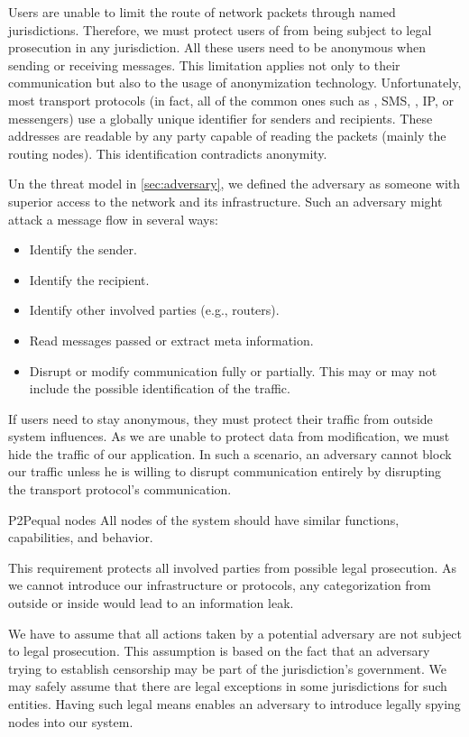 Users are unable to limit the route of network packets through named jurisdictions. Therefore, we must protect users of \MessageVortex{} from being subject to legal prosecution in any jurisdiction. All these users need to be anonymous when sending or receiving messages. This limitation applies not only to their communication but also to the usage of anonymization technology. Unfortunately, most transport protocols (in fact, all of the common ones such as , SMS, , IP, or messengers) use a globally unique identifier for senders and recipients. These addresses are readable by any party capable of reading the packets (mainly the routing nodes).  This identification contradicts anonymity.

Un the threat model in \cref{sec:adversary}, we defined the adversary as someone with superior access to the network and its infrastructure. Such an adversary might attack a message flow in several ways:
\begin{itemize}
	\item Identify the sender.
	\item Identify the recipient.
	\item Identify other involved parties (e.g., routers).
	\item Read messages passed or extract meta information.
	\item Disrupt or modify communication fully or partially. This may or may not include the possible identification of the traffic.
\end{itemize}

If users need to stay anonymous, they must protect their traffic from outside system influences. As we are unable to protect data from modification, we must hide the traffic of our application. In such a scenario, an adversary cannot block our traffic unless he is willing to disrupt communication entirely by disrupting the transport protocol's communication. 

\begin{requirement}{P2P}{equal nodes}
	All nodes of the system should have similar functions, capabilities, and behavior.
\end{requirement}

This requirement protects all involved parties from possible legal prosecution. As we cannot introduce our infrastructure or protocols, any categorization from outside or inside would lead to an information leak. 

We have to assume that all actions taken by a potential adversary are not subject to legal prosecution. This assumption is based on the fact that an adversary trying to establish censorship may be part of the jurisdiction's government. We may safely assume that there are legal exceptions in some jurisdictions for such entities. Having such legal means enables an adversary to introduce legally spying nodes into our system.

